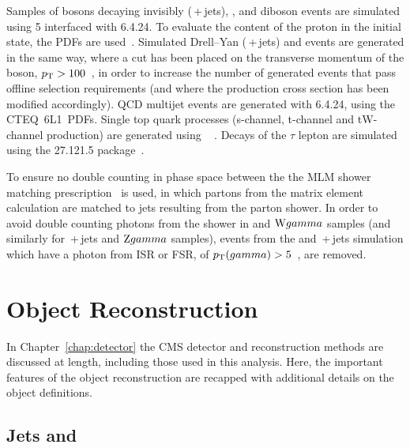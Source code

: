 Samples of \Z bosons decaying invisibly (\znunubr{}\,+\,jets), \ttbar, and diboson events 
are simulated using \MADGRAPH{}5 interfaced with \PYTHIA{}6.4.24. 
To evaluate the content of the proton in the initial state, the  \ac{PDFs} are used~\cite{CTEQ6}. 
Simulated Drell--Yan (\zellellbr{}\,+\,jets) and \wpj{} events are generated in the same way, where a cut has been placed on the transverse momentum of the boson, $p_{\text{T}} > 100$~\GeV, in order to increase the number of generated events that pass offline selection requirements (and where the production cross section has been modified accordingly).
QCD multijet events are generated with \PYTHIA{}6.4.24, using the CTEQ~6L1~\ac{PDFs}. 
Single top quark processes (s-channel, t-channel and tW-channel production) are generated using \POWHEG~\cite{powheg_st,powheg_tw} .
Decays of the $\tau$ lepton are simulated using the \TAUOLA{} 27.121.5 package~\cite{TAUOLA}. 

To ensure no double counting in phase space between the 
the MLM shower matching prescription~\cite{bib:GEN_MLM} is used, in which partons from the matrix element calculation are matched to jets resulting from the parton shower.
In order to avoid double counting photons from the \PYTHIA shower in \wpj{} and $\mathrm{W}gamma${} samples (and similarly for \zellellbr{}\,+\,jets and $\mathrm{Z}gamma${} samples), 
events from the \wpj{} and \zellellbr{}\,+\,jets simulation which have a photon from \ac{ISR} or \ac{FSR}, of $p_{\text{T}}(gamma)>5$~\GeV, are removed.


\section{Object Reconstruction}
\label{sec:objectReco}

In Chapter~\ref{chap:detector} the CMS detector and reconstruction methods are discussed at length, including those used in this analysis. 
Here, the important features of the object reconstruction are recapped with additional details on the object definitions.

\subsection{Jets and \MET}

